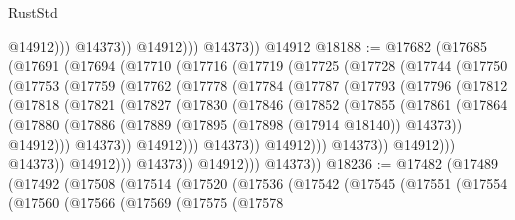 \begin{lexlean}{RustStd}
\begin{coremodule}
                        @14912)))
                  @14373))
              @14912)))
        @14373))
    @14912
@18188 := @17682
    (@17685
      (@17691
        (@17694
          (@17710
            (@17716
              (@17719
                (@17725
                  (@17728
                    (@17744
                      (@17750
                        (@17753
                          (@17759
                            (@17762
                              (@17778
                                (@17784
                                  (@17787
                                    (@17793
                                      (@17796
                                        (@17812
                                          (@17818
                                            (@17821
                                              (@17827
                                                (@17830
                                                  (@17846
                                                    (@17852
                                                      (@17855
                                                        (@17861
                                                          (@17864
                                                            (@17880
                                                              (@17886
                                                                (@17889
                                                                  (@17895
                                                                    (@17898 (@17914 @18140))
                                                                    @14373))
                                                                @14912)))
                                                          @14373))
                                                      @14912)))
                                                @14373))
                                            @14912)))
                                      @14373))
                                  @14912)))
                            @14373))
                        @14912)))
                  @14373))
              @14912)))
        @14373))
@18236 := @17482
    (@17489
      (@17492
        (@17508
          (@17514
            (@17520
              (@17536
                (@17542
                  (@17545
                    (@17551
                      (@17554
                        (@17560
                          (@17566
                            (@17569
                              (@17575
                                (@17578

\end{coremodule}
\end{lexlean}
